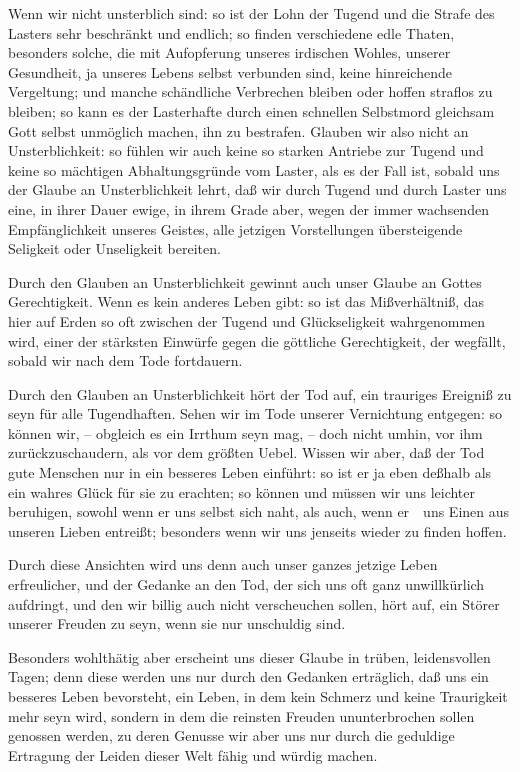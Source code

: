 \begin{aufza}
\begin{aufzb}
\item Wenn wir nicht unsterblich sind: so ist der Lohn der Tugend und die Strafe des Lasters sehr beschränkt und endlich; so finden verschiedene edle Thaten, besonders solche, die mit Aufopferung unseres irdischen Wohles, unserer Gesundheit, ja unseres Lebens selbst verbunden sind, keine hinreichende Vergeltung; und manche schändliche Verbrechen bleiben oder hoffen straflos zu bleiben; so kann es der Lasterhafte durch einen schnellen Selbstmord gleichsam Gott selbst unmöglich machen, ihn zu bestrafen. Glauben wir also nicht an Unsterblichkeit: so fühlen wir auch keine so starken Antriebe zur Tugend und keine so mächtigen Abhaltungsgründe vom Laster, als es der Fall ist, sobald uns der Glaube an Unsterblichkeit lehrt, daß wir durch Tugend und durch Laster uns eine, in ihrer Dauer ewige, in ihrem Grade aber, wegen der immer wachsenden Empfänglichkeit unseres Geistes, alle jetzigen Vorstellungen übersteigende Seligkeit oder Unseligkeit bereiten.
\item Durch den Glauben an Unsterblichkeit gewinnt auch unser Glaube an Gottes Gerechtigkeit. Wenn es kein anderes Leben gibt: so ist das Mißverhältniß, das hier auf Erden so oft zwischen der Tugend und Glückseligkeit wahrgenommen wird, einer der stärksten Einwürfe gegen die göttliche Gerechtigkeit, der wegfällt, sobald wir nach dem Tode fortdauern.
\item Durch den Glauben an Unsterblichkeit hört der Tod auf, ein trauriges Ereigniß zu seyn für alle Tugendhaften. Sehen wir im Tode unserer Vernichtung entgegen: so können wir, -- obgleich es ein Irrthum seyn mag, -- doch nicht umhin, vor ihm zurückzuschaudern, als vor dem größten Uebel.
Wissen wir aber, daß der Tod gute Menschen nur in ein besseres Leben einführt: so ist er ja eben deßhalb als ein wahres Glück für sie zu erachten; so können und müssen wir uns leichter beruhigen, sowohl wenn er uns selbst sich naht, als auch, wenn er~\ uns Einen aus unseren Lieben entreißt; besonders wenn wir uns jenseits wieder zu finden hoffen.
\item Durch diese Ansichten wird uns denn auch unser ganzes jetzige Leben erfreulicher, und der Gedanke an den Tod, der sich uns oft ganz unwillkürlich aufdringt, und den wir billig auch nicht verscheuchen sollen, hört auf, ein Störer unserer Freuden zu seyn, wenn sie nur unschuldig sind.
\item Besonders wohlthätig aber erscheint uns dieser Glaube in trüben, leidensvollen Tagen; denn diese werden uns nur durch den Gedanken erträglich, daß uns ein besseres Leben bevorsteht, ein Leben, in dem kein Schmerz und keine Traurigkeit mehr seyn wird, sondern in dem die reinsten Freuden ununterbrochen sollen genossen werden, zu deren Genusse wir aber uns nur durch die geduldige Ertragung der Leiden dieser Welt fähig und würdig machen.
\end{aufzb}
\end{aufza}\par
